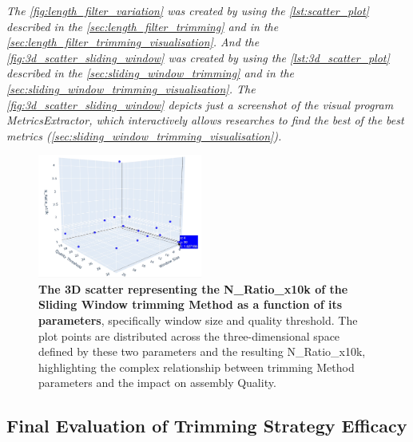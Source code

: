 \textit{The \autoref{fig:length_filter_variation} was created by using the \autoref{lst:scatter_plot} described in the  \autoref{sec:length_filter_trimming} and in the  \autoref{sec:length_filter_trimming_visualisation}. And the \autoref{fig:3d_scatter_sliding_window} was created by using the \autoref{lst:3d_scatter_plot} described in the  \autoref{sec:sliding_window_trimming} and in the \autoref{sec:sliding_window_trimming_visualisation}. The \autoref{fig:3d_scatter_sliding_window} depicts just a screenshot of the visual program MetricsExtractor, which interactively allows researches to find the best of the best metrics (\autoref{sec:sliding_window_trimming_visualisation}).}


\begin{figure}
  \centering
  \includegraphics[width=0.48\textwidth]{resources/images/3d_scatter_sliding_window.png}
  \caption{\textbf{The 3D \gls{scatter} representing the N\_Ratio\_x10k of the Sliding Window \gls{trimming} Method as a function of its parameters}, specifically window size and quality threshold. The plot points are distributed across the three-dimensional space defined by these two parameters and the resulting N\_Ratio\_x10k, highlighting the complex relationship between \gls{trimming} Method parameters and the impact on \gls{assembly} Quality.}
  \label{fig:3d_scatter_sliding_window}
\end{figure}



\subsection{Final Evaluation of Trimming Strategy Efficacy}

